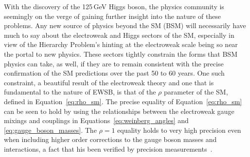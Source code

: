 With the discovery of the 125\,GeV Higgs boson, the physics community is seemingly
on the verge of gaining further insight into the nature of these problems.
Any new source of physics beyond the SM (BSM) will necessarily have much to say
about the electroweak and Higgs sectors of the SM,
especially in view of the Hierarchy Problem's hinting at the electroweak scale
being so near the portal to new physics.
These sectors tightly constrain the forms that BSM physics can take, as well, if they
are to remain consistent with the precise confirmation of the SM predictions
over the past 50 to 60 years.
One such constraint, a beautiful result of the electroweak theory and one that
is fundamental to the nature of EWSB, is that of the $\rho$ parameter of the SM,
defined in Equation~\ref{eq:rho_sm}.
The precise equality of Equation~\ref{eq:rho_sm} can be seen to hold by using the relationships
between the electroweak gauge mixings and couplings in Equations~\ref{eq:weinberg_angles} and \ref{eq:gauge_boson_masses}.
The $\rho = 1$ equality holds to very high precision even when including higher order
corrections to the gauge boson masses and interactions, a fact that his been verified
by precision measurements~\cite{EWSBProbeRho,PDGRef}.

